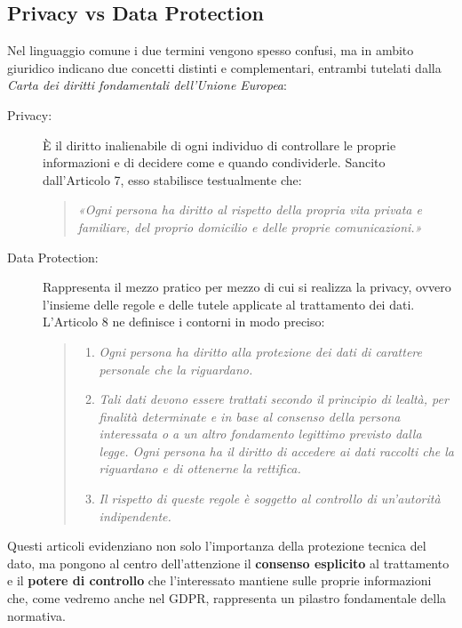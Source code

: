 \subsection*{Privacy vs Data Protection}

Nel linguaggio comune i due termini vengono spesso confusi, ma in ambito giuridico indicano due concetti distinti e complementari, entrambi tutelati dalla \textit{Carta dei diritti fondamentali dell'Unione Europea}:

\begin{description}
    \item[Privacy:] È il diritto inalienabile di ogni individuo di controllare le proprie informazioni e di decidere come e quando condividerle. Sancito dall'Articolo 7, esso stabilisce testualmente che:
    \begin{quote}
        \textit{«Ogni persona ha diritto al rispetto della propria vita privata e familiare, del proprio domicilio e delle proprie comunicazioni.»}
    \end{quote}

    \item[Data Protection:] Rappresenta il mezzo pratico per mezzo di cui si realizza la privacy, ovvero l'insieme delle regole e delle tutele applicate al trattamento dei dati. L'Articolo 8 ne definisce i contorni in modo preciso:
    \begin{quote}
        \begin{enumerate}
            \item \textit{Ogni persona ha diritto alla protezione dei dati di carattere personale che la riguardano.}
            \item \textit{Tali dati devono essere trattati secondo il principio di lealtà, per finalità determinate e in base al consenso della persona interessata o a un altro fondamento legittimo previsto dalla legge. Ogni persona ha il diritto di accedere ai dati raccolti che la riguardano e di ottenerne la rettifica.}
            \item \textit{Il rispetto di queste regole è soggetto al controllo di un'autorità indipendente.}           
        \end{enumerate}
    \end{quote}
\end{description}

Questi articoli evidenziano non solo l'importanza della protezione tecnica del dato, ma pongono al centro dell'attenzione il \textbf{consenso esplicito} al trattamento e il \textbf{potere di controllo} che l'interessato mantiene sulle proprie informazioni che, come vedremo anche nel GDPR, rappresenta un pilastro fondamentale della normativa.

